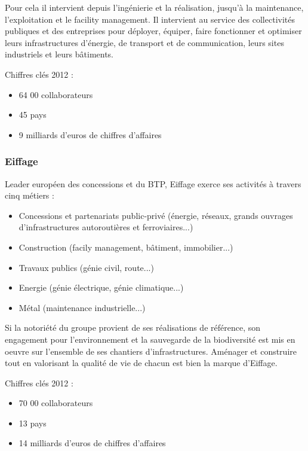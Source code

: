	Pour cela il intervient depuis l'ingénierie et la réalisation, jusqu'à la maintenance, l'exploitation et le facility management. Il intervient au service des collectivités publiques et des entreprises pour déployer, équiper, faire fonctionner et optimiser leurs infrastructures d'énergie, de transport et de communication, leurs sites industriels et leurs bâtiments.

Chiffres clés 2012 :
\begin{itemize}
	\item 64 00 collaborateurs
	\item 45 pays
	\item 9 milliards d'euros de chiffres d'affaires
\end{itemize}

\subsubsection{Eiffage}
	Leader européen des concessions et du BTP, Eiffage exerce ses activités à travers cinq métiers :
\begin{itemize}
	\item Concessions et partenariats public-privé (énergie, réseaux, grands ouvrages d'infrastructures autoroutières et ferroviaires...)
	\item Construction (facily management, bâtiment, immobilier...)
	\item Travaux publics (génie civil, route...)
	\item Energie (génie électrique, génie climatique...)
	\item Métal (maintenance industrielle...)
\end{itemize}

	Si la notoriété du groupe provient de ses réalisations de référence, son engagement pour l'environnement et la sauvegarde de la biodiversité est mis en oeuvre sur l'ensemble de ses chantiers d'infrastructures. Aménager et construire tout en valorisant la qualité de vie de chacun est bien la marque d'Eiffage.

Chiffres clés 2012 :
\begin{itemize}
	\item 70 00 collaborateurs
	\item 13 pays
	\item 14 milliards d'euros de chiffres d'affaires
\end{itemize}

